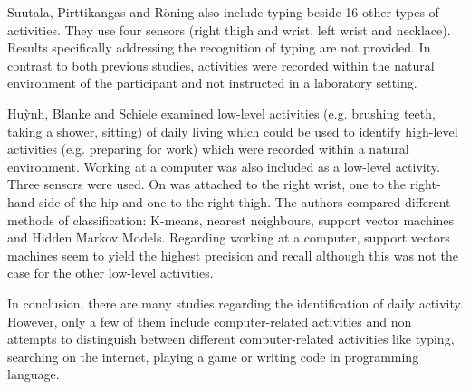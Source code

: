 \documentclass[11pt,a4paper]{paper}
\begin{document}
Suutala, Pirttikangas and Röning \cite{suutalaetal2007} also 
 include typing beside 16 other types of activities. 
They use four sensors (right thigh and wrist, left wrist and necklace).
Results specifically addressing the recognition of typing are not provided.
In contrast to both previous studies, activities were recorded within the
 natural environment of the participant and not instructed in a laboratory setting.
 
Hu\`{y}nh, Blanke and Schiele \cite{huynhetal2007} examined low-level activities (e.g. brushing teeth,
 taking a shower, sitting) of daily living which could be used to identify high-level activities (e.g. 
 preparing for work) which were recorded within a natural environment.
Working at a computer was also included as a low-level activity.
Three sensors were used. On was attached to the right wrist, one to the right-hand side of the hip 
 and one to the right thigh.
The authors compared different methods of classification: K-means, nearest neighbours, support vector machines and
 Hidden Markov Models.
Regarding working at a computer, support vectors machines seem to yield the highest precision and recall 
 although this was not the case for the other low-level activities.
 
In conclusion, there are many studies regarding the identification of daily activity.
However, only a few of them include computer-related activities and non attempts to distinguish
 between different computer-related activities like typing, searching on the internet, playing a game or
 writing code in programming language.
 
 
 


 


 






\end{document}
